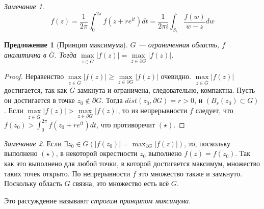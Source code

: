 \documentclass[12pt]{article}
\newcounter{cnt}
\theoremstyle{thmnote}
\newtheorem{proposition}[cnt]{Предложение}
\theoremstyle{remark}
\newtheorem*{remark}{Замечание}
\theoremstyle{defnote}
\begin{document}
\begin{remark}
    \begin{equation}\tag{$\star$}
        f(z) = \frac{1}{2\pi} \int_{0}^{2\pi} f(z + re^{it})dt = \frac{1}{2\pi i} \int_{S_r} \frac{f(w)}{w - z}dw
    \end{equation}
\end{remark}

\begin{proposition}[Принцип максимума]
\label{prmax}
    $G$ --- ограниченная область, $f$ аналитична в $\overline{G}$. Тогда $\underset{z \in \overline{G}}{\max} |f(z)| = \underset{z \in \partial G}{\max} |f(z)|$.
\end{proposition}
\begin{proof}
    Неравенство $\underset{z \in \overline{G}}{\max} |f(z)| \geq \underset{z \in \partial G}{\max} |f(z)|$ очевидно. $\underset{z \in \overline{G}}{\max} |f(z)|$ достигается, так как $\overline{G}$ замкнута и ограничена, следовательно, компактна. Пусть он достигается в точке $z_0 \notin \partial G$. Тогда $dist(z_0, \partial G) = r > 0$, и $(B_r(z_0) \subset G)$. Если $\underset{z \in \overline{G}}{\max} |f(z)| > \underset{z \in \partial G}{\max} |f(z)|$, то из непрерывности $f$ следует, что $f(z_0) > \int_0^{2\pi} f(z_0 + re^{it})dt$, что противоречит $(\star)$.
\end{proof}

\begin{remark}
    Если $\exists z_0 \in G \left(|f(z_0)| = \max_{\partial G}|f(z)|\right)$, то, поскольку выполнено $(\star)$, в некоторой окрестности $z_0$ выполнено $f(z) = f(z_0)$. Так как это выполнено для любой точки, в которой достигается максимум, множество таких точек открыто. По непрерывности $f$ это множество также и замкнуто. Поскольку область $G$ связна, это множество есть всё $G$.

    Это рассуждение называют \textit{строгим принципом максимума}.
\end{remark}
\end{document}

